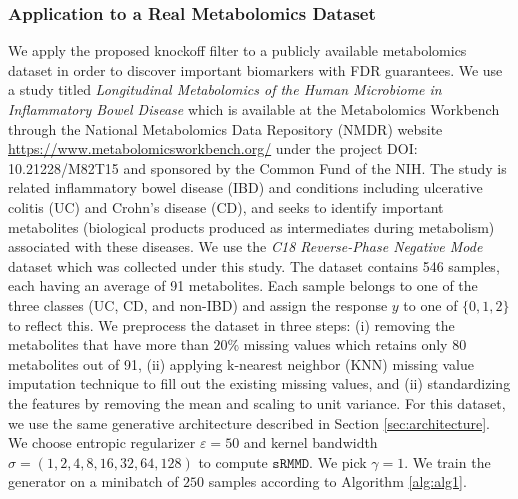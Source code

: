 \documentclass{article}
\theoremstyle{definition}
\newcommand{\srmmd}{\mathtt{sRMMD}}
\begin{document}
\subsubsection{Application to a Real Metabolomics Dataset}
We apply the proposed knockoff filter to a publicly available metabolomics dataset in order to discover important biomarkers with FDR guarantees. We use a study titled \emph{Longitudinal Metabolomics of the Human Microbiome in Inflammatory Bowel Disease} \cite{lloyd2019multi} which is available at the Metabolomics Workbench through the National Metabolomics Data Repository (NMDR) website \url{https://www.metabolomicsworkbench.org/} under the project DOI: 10.21228/M82T15 and sponsored by the Common Fund of the NIH. The study is related inflammatory bowel disease (IBD) and conditions including ulcerative colitis (UC) and Crohn’s disease (CD), and seeks to identify important metabolites (biological products produced as intermediates during metabolism) associated with these diseases. We use the \emph{C18 Reverse-Phase Negative Mode} dataset which was collected under this study. The dataset contains 546 samples, each having an average of 91 metabolites. Each sample belongs to one of the three classes (UC, CD, and non-IBD) and assign the response $y$ to one of $\{0, 1, 2\}$ to reflect this. We preprocess the dataset in three steps: (i) removing the metabolites that have more than $20\%$ missing values which retains only 80 metabolites out of 91, (ii) applying k-nearest neighbor (KNN) missing value imputation technique to fill out the existing missing values, and (ii) standardizing the features by removing the mean and scaling to unit variance. For this dataset, we use the same generative architecture described in Section \ref{sec:architecture}.  We choose entropic regularizer $\varepsilon =50$ and kernel bandwidth $\sigma = (1, 2,4, 8, 16, 32, 64, 128)$ to compute $\srmmd$. We pick $\gamma = 1$. We train the generator on a minibatch of $250$ samples according to Algorithm \ref{alg:alg1}. 
\end{document}
